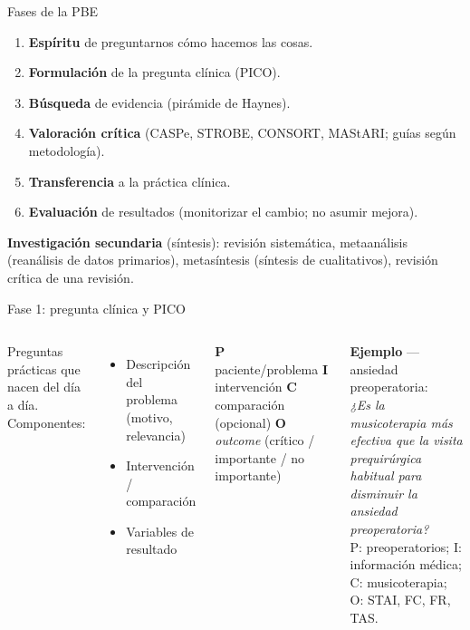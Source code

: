\documentclass[aspectratio=169,8pt]{beamer}
\begin{document}
\begin{frame}{Fases de la PBE}
  \small
  \begin{enumerate}
    \item[\textbf{0.}] \textbf{Esp\'iritu} de preguntarnos c\'omo hacemos las cosas.
    \item[\textbf{1.}] \textbf{Formulaci\'on} de la pregunta cl\'inica (PICO).
    \item[\textbf{2.}] \textbf{B\'usqueda} de evidencia (pir\'amide de Haynes).
    \item[\textbf{3.}] \textbf{Valoraci\'on cr\'itica} (CASPe, STROBE, CONSORT, MAStARI; gu\'ias seg\'un metodolog\'ia).
    \item[\textbf{4.}] \textbf{Transferencia} a la pr\'actica cl\'inica.
    \item[\textbf{5.}] \textbf{Evaluaci\'on} de resultados (monitorizar el cambio; no asumir mejora).
  \end{enumerate}
  \vspace{0.3em}
  \begin{tcolorbox}[amberbox]
    \footnotesize\textbf{Investigaci\'on secundaria} (s\'intesis): revisi\'on sistem\'atica, metaan\'alisis (rean\'alisis de datos primarios), metas\'intesis (s\'intesis de cualitativos), revisi\'on cr\'itica de una revisi\'on.
  \end{tcolorbox}
\end{frame}

\begin{frame}{Fase 1: pregunta cl\'inica y PICO}
  \small
  \begin{columns}[T,onlytextwidth]
      Preguntas pr\'acticas que nacen del d\'ia a d\'ia. Componentes:
      \begin{itemize}
        \item Descripci\'on del problema (motivo, relevancia)
        \item Intervenci\'on / comparaci\'on
        \item Variables de resultado
      \end{itemize}
      \begin{tcolorbox}[formulabox,title=PICO]
        \footnotesize
        \textbf{P} paciente/problema\;
        \textbf{I} intervenci\'on\;
        \textbf{C} comparaci\'on (opcional)\;
        \textbf{O} \emph{outcome} (cr\'itico / importante / no importante)
      \end{tcolorbox}
      \begin{tcolorbox}[tealbox]
        \footnotesize\textbf{Ejemplo} --- ansiedad preoperatoria:\\
        \emph{¿Es la musicoterapia m\'as efectiva que la visita prequir\'urgica habitual para disminuir la ansiedad preoperatoria?}\\[3pt]
        P: preoperatorios; I: informaci\'on m\'edica; C: musicoterapia; O: STAI, FC, FR, TAS.
      \end{tcolorbox}
    \end{columns}
\end{frame}
\end{document}
